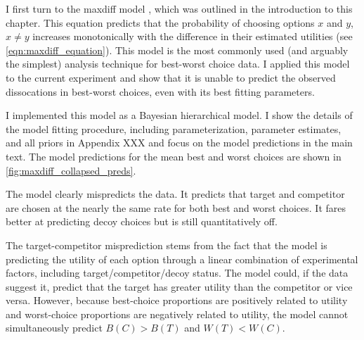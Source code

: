 
I first turn to the maxdiff model \parencite{marleyProbabilisticModelsBest2005}, which was outlined in the introduction to this chapter. This equation predicts that the probability of choosing options $x$ and $y$, $x \neq y$ increases monotonically with the difference in their estimated utilities (see \ref{eqn:maxdiff_equation}). This model is the most commonly used (and arguably the simplest) analysis technique for best-worst choice data. I applied this model to the current experiment and show that it is unable to predict the observed dissocations in best-worst choices, even with its best fitting parameters.

I implemented this model as a Bayesian hierarchical model. I show the details of the model fitting procedure, including parameterization, parameter estimates, and all priors in Appendix XXX and focus on the model predictions in the main text. The model predictions for the mean best and worst choices are shown in \ref{fig:maxdiff_collapsed_preds}.

The model clearly mispredicts the data. It predicts that target and competitor are chosen at the nearly the same rate for both best and worst choices. It fares better at predicting decoy choices but is still quantitatively off.

The target-competitor misprediction stems from the fact that the model is predicting the utility of each option through a linear combination of experimental factors, including target/competitor/decoy status. The model could, if the data suggest it, predict that the target has greater utility than the competitor or vice versa. However, because best-choice proportions are positively related to utility and worst-choice proportions are negatively related to utility, the model cannot simultaneously predict $B(C)>B(T)$ and $W(T)<W(C)$. 

